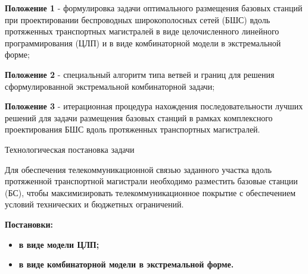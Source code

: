\begin{frame}
    \justifying
    \begin{center}
        \fontsize{8pt}{7.2}\selectfont
        {\textbf{Положение 1} - формулировка задачи оптимального размещения базовых станций при проектировании беспроводных широкополосных сетей (БШС) вдоль протяженных транспортных магистралей в виде целочисленного линейного программирования (ЦЛП) и в виде комбинаторной модели в экстремальной форме;}
        \bigskip
        
        {\textbf{Положение 2} - специальный алгоритм типа ветвей и границ для решения сформулированной экстремальной комбинаторной задачи;}
        \bigskip

        {\textbf{Положение 3} - итерационная процедура нахождения последовательности лучших решений для задачи размещения базовых станций в рамках комплексного проектирования БШС вдоль протяженных транспортных магистралей.}
    \end{center}

    \begin{minipage}[t]{0.5\linewidth} 
        
    \end{minipage}
    \hfill
    \begin{minipage}[t]{0.4\linewidth}
    \end{minipage}

\end{frame}

\begin{frame}
    {Технологическая постановка задачи} 
    \justifying
    
    Для обеспечения телекоммуникационной связью заданного участка вдоль протяженной транспортной магистрали необходимо разместить базовые станции (БС), чтобы максимизировать телекоммуникационное покрытие с обеспечением условий технических и бюджетных ограничений. 

    \bigskip
    
    \textbf{Постановки:}
    \begin{itemize}
        \item \textbf{в виде модели ЦЛП;}
        \item \textbf{в виде комбинаторной модели в экстремальной форме.}
    \end{itemize}

\end{frame}

